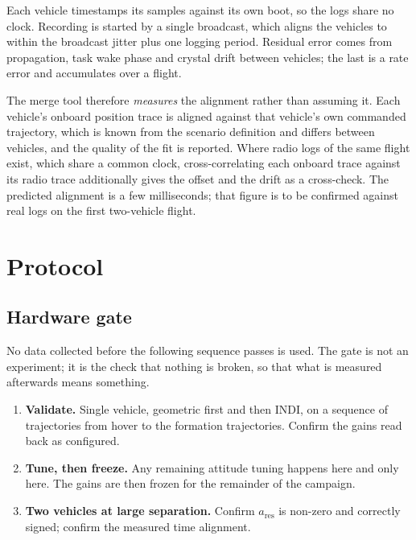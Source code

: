 Each vehicle timestamps its samples against its own boot, so the logs share no clock. Recording is
started by a single broadcast, which aligns the vehicles to within the broadcast jitter plus one
logging period. Residual error comes from propagation, task wake phase and crystal drift between
vehicles; the last is a rate error and accumulates over a flight.

The merge tool therefore \emph{measures} the alignment rather than assuming it. Each vehicle's
onboard position trace is aligned against that vehicle's own commanded trajectory, which is known
from the scenario definition and differs between vehicles, and the quality of the fit is reported.
Where radio logs of the same flight exist, which share a common clock, cross-correlating each
onboard trace against its radio trace additionally gives the offset and the drift as a
cross-check. The predicted alignment is a few milliseconds; that figure is to be confirmed
against real logs on the first two-vehicle flight.

\section{Protocol}
\label{sec:setup-protocol}

\subsection{Hardware gate}
\label{sec:setup-gate}

No data collected before the following sequence passes is used. The gate is not an experiment; it
is the check that nothing is broken, so that what is measured afterwards means something.

\begin{enumerate}
  \item \textbf{Validate.} Single vehicle, geometric first and then INDI, on a sequence of trajectories from hover to the
        formation trajectories.
        Confirm the gains read back as configured.
  \item \textbf{Tune, then freeze.} Any remaining attitude tuning happens here and only here. The
        gains are then frozen for the remainder of the campaign.
  \item \textbf{Two vehicles at large separation.} Confirm $a_{\mathrm{res}}$ is non-zero and
        correctly signed; confirm the measured time alignment.
\end{enumerate}


